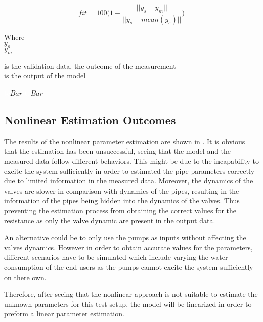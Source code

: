 \begin{equation}
  fit = 100 \bigg(1 - \frac{||y_s - y_m||}{||y_s - mean(y_s)||}\bigg)
  \label{fitequation}
\end{equation} 

\begin{minipage}[t]{0.20\textwidth}
Where\\
\hspace*{8mm} $y_s$ \\
\hspace*{8mm} $y_m$ \\
\end{minipage}
\begin{minipage}[t]{0.68\textwidth}
\vspace*{2mm}
is the validation data, the outcome of the measurement \\
is the output of the model\\
\end{minipage}
\begin{minipage}[t]{0.10\textwidth}
\vspace*{2mm}
\textcolor{White}{te}$\unit{Bar}$
\textcolor{White}{te}$\unit{Bar}$
\end{minipage}

\subsection{Nonlinear Estimation Outcomes} 
\label{NonLiOutcome}
The results of the nonlinear parameter estimation are shown in . It is obvious that the estimation has been unsuccessful, seeing 
that the model and the measured data follow different behaviors. This might be due to the incapability to excite the system sufficiently in order to estimated the pipe parameters correctly due to limited information in the measured data. Moreover, the dynamics of the valves are slower in comparison with dynamics of the pipes, resulting in the information of the pipes being hidden into the dynamics of the valves. Thus preventing the estimation process from obtaining the correct values for the resistance as only the valve dynamic are present in the output data.

An alternative could be to only use the pumps as inputs without affecting
the valves dynamics. However in order to obtain accurate values for the parameters, different scenarios have to be simulated which include varying the water consumption 
of the end-users as the pumps cannot excite the system sufficiently on there own. 

Therefore, after seeing that the nonlinear approach is not suitable to estimate the unknown parameters for this test setup, the model will be linearized in order to preform a linear parameter estimation.